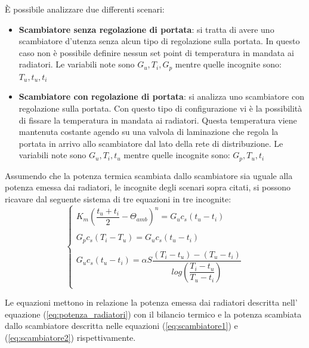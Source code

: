 \documentclass[laurea,oneside,11pt]{USiena_tesiLM}
\begin{document}
\`E possibile analizzare due differenti scenari:
\begin{itemize}
\item \textbf{Scambiatore senza regolazione di portata}: si tratta di avere uno scambiatore d'utenza senza alcun tipo di regolazione sulla portata. In questo caso non è possibile definire nessun set point di temperatura in mandata ai radiatori. Le variabili note sono $G_u, T_i, G_p$ mentre quelle incognite sono: $T_u, t_u, t_i$

\item \textbf{Scambiatore con regolazione di portata}: si analizza uno scambiatore con regolazione sulla portata. Con questo tipo di configurazione vi è la possibilità di fissare la temperatura in mandata ai radiatori. Questa temperatura viene mantenuta costante agendo su una valvola di laminazione che regola la portata in arrivo allo scambiatore dal lato della rete di distribuzione.   Le  variabili note sono $G_u, T_i, t_u$ mentre quelle incognite sono: $G_p, T_u, t_i$
\end{itemize}
Assumendo che la potenza termica scambiata dallo scambiatore sia uguale alla potenza emessa dai radiatori, le incognite degli scenari sopra citati, si possono ricavare dal seguente sistema di  tre equazioni in tre incognite: 
\begin{equation}
\left \{
\begin{array}{rl}
K_m(\dfrac{t_u + t_i}{2} - \Theta_{amb})^n = G_u c_s (t_u - t_i)\\
\\
G_p c_s (T_i - T_u) = G_u c_s (t_u - t_i)\\
\\
G_u c_s (t_u - t_i) = \alpha S \dfrac{(T_i - t_u)-(T_u - t_i )}{log\left( \dfrac{T_i - t_u}{T_u - t_i } \right)}\\
\end{array}
\right.
\end{equation}

Le equazioni mettono in relazione la potenza emessa dai radiatori descritta nell' equazione (\ref{eq:potenza_radiatori}) con il bilancio termico e la potenza scambiata dallo scambiatore descritta nelle equazioni (\ref{eq:scambiatore1}) e (\ref{eq:scambiatore2}) rispettivamente.
\end{document}
